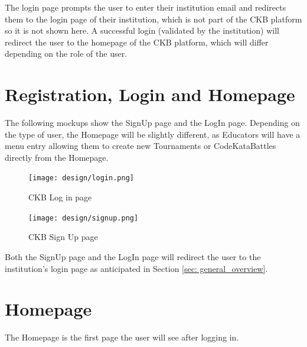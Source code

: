The login page prompts the user to enter their institution email and redirects them to the login page of their institution, 
which is not part of the CKB platform so it is not shown here.
A successful login (validated by the institution) will redirect the user to the homepage of the CKB platform, which will differ depending on the role of the user.


\section{Registration, Login and Homepage}
\label{sec: registration_login_homepage}%
The following mockups show the SignUp page and the LogIn page. 
Depending on the type of user, the Homepage will be slightly different, as Educators will have a menu entry allowing them to
create new Tournaments or CodeKataBattles directly from the Homepage.

\begin{figure}[H]
    \begin{minipage}{0.45\linewidth}
        \centering
        \texttt{[image: design/login.png]}
        \caption{CKB Log in page}
        \label{fig: login}
    \end{minipage}\hfill
    \begin{minipage}{0.45\linewidth}
        \centering
        \texttt{[image: design/signup.png]}
        \caption{CKB Sign Up page}
        \label{fig: signup}
    \end{minipage}
\end{figure}

Both the SignUp page and the LogIn page will redirect the user to the institution's login page as anticipated in Section \ref{sec: general_overview}.
\newpage
\section{Homepage}
\label{sec: homepage}%
The Homepage is the first page the user will see after logging in. 

